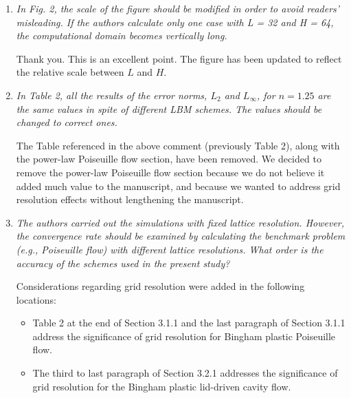 \documentclass{article}
\begin{document}
	\begin{enumerate}
		\item \emph{In Fig. 2, the scale of the figure should be modified in order to avoid readers’ misleading. If the authors calculate only one case with L = 32 and H = 64, the computational domain becomes vertically long.}
		
		Thank you. This is an excellent point. The figure has been updated to reflect the relative scale between $L$ and $H$.
		
		\item \emph{In Table 2, all the results of the error norms, $L_{2}$ and $L_{\infty}$, for $n = 1.25$ are the same values in spite of different LBM schemes. The values should be changed to correct ones.}
		
		
		The Table referenced in the above comment (previously Table 2), along with the power-law Poiseuille flow section, have been removed. We decided to remove the power-law Poiseuille flow section because we do not believe it added much value to the manuscript, and because we wanted to address grid resolution effects without lengthening the manuscript.
		
		\item \emph{The authors carried out the simulations with fixed lattice resolution. However, the convergence rate should be examined by calculating the benchmark problem (e.g., Poiseuille flow) with different lattice resolutions. 
		What order is the accuracy of the schemes used in the present study?}
	
		Considerations regarding grid resolution were added in the following locations:
		\begin{itemize}
			\item Table 2 at the end of Section 3.1.1 and the last paragraph of Section 3.1.1 address the significance of grid resolution for Bingham plastic Poiseuille flow.
			\item The third to last paragraph of Section 3.2.1 addresses the significance of grid resolution for the Bingham plastic lid-driven cavity flow.
		\end{itemize}
	

\end{enumerate}
\end{document}

